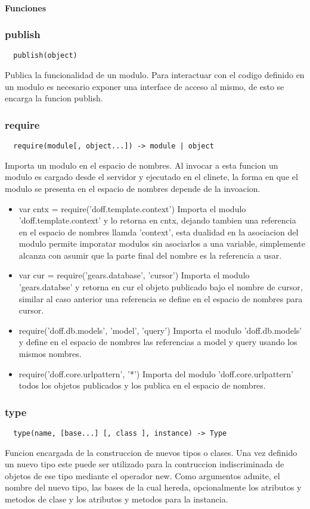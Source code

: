 \paragraph{Funciones}
\subsubsection*{publish}
\begin{verbatim}
  publish(object)
\end{verbatim}
Publica la funcionalidad de un modulo.
Para interactuar con el codigo definido en un modulo es necesario
exponer una interface de acceso al mismo, de esto se encarga la funcion publish.

\subsubsection*{require}
\begin{verbatim}
  require(module[, object...]) -> module | object
\end{verbatim} 
Importa un modulo en el espacio de nombres.
Al invocar a esta funcion un modulo es cargado desde el servidor y ejecutado en
el clinete, la forma en que el modulo se presenta en el espacio de nombres
depende de la invoacion.
\begin{itemize}
 \item{var cntx = require('doff.template.context')}
  Importa el modulo 'doff.template.context' y lo retorna en cntx, dejando
tambien una referencia en el espacio de nombres llamda 'context', esta dualidad
en la asociacion del modulo permite imporatar modulos sin asociarlos a una
variable, simplemente alcanza con asumir que la parte final del nombre es la
referencia a usar.
 \item{var cur = require('gears.database', 'cursor')}
  Importa el modulo 'gears.databse' y retorna en cur el objeto publicado bajo el
nombre de cursor, similar al caso anterior una referencia se define en el
espacio de nombres para cursor.  
 \item{require('doff.db.models', 'model', 'query')}
  Importa el modulo 'doff.db.models' y define en el espacio de nombres las
referencias a model y query usando los mismos nombres.
 \item{require('doff.core.urlpattern', '*')}
  Importa del modulo 'doff.core.urlpattern' todos los objetos publicados y los
publica en el espacio de nombres.
\end{itemize}

\subsubsection*{type}
\begin{verbatim}
  type(name, [base...] [, class ], instance) -> Type
\end{verbatim} 
Funcion encargada de la construccion de nuevos tipos o clases.
Una vez definido un nuevo tipo este puede ser utilizado para la contruccion
indiscriminada de objetos de ese tipo mediante el operador new.
Como argumentos admite, el nombre del nuevo tipo, las bases de la cual hereda,
opcionalmente los atributos y metodos de clase y los atributos y metodos para la
instancia.

